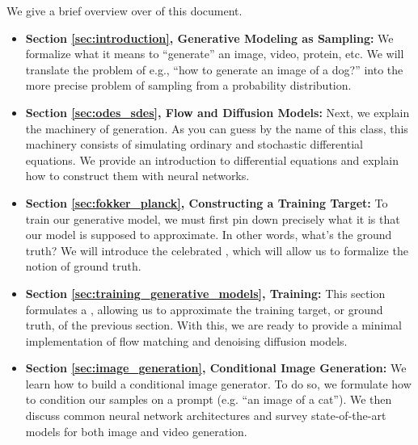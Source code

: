 We give a brief overview over of this document.
\begin{itemize}
\item \textbf{\sffamily Section \ref{sec:introduction}, Generative Modeling as Sampling:} We formalize what it means to ``generate'' an image, video, protein, etc. We will translate the problem of e.g., ``how to generate an image of a dog?'' into the more precise problem of sampling from a probability distribution.
\item \textbf{\sffamily Section \ref{sec:odes_sdes}, Flow and Diffusion Models:} Next, we explain the machinery of generation. As you can guess by the name of this class, this machinery consists of simulating ordinary and stochastic differential equations. We provide an introduction to differential equations and explain how to construct them with neural networks. 
\item \textbf{\sffamily Section \ref{sec:fokker_planck}, Constructing a Training Target:} To train our generative model, we must first pin down precisely what it is that our model is supposed to approximate. In other words, what's the ground truth? We will introduce the celebrated , which will allow us to formalize the notion of ground truth.
\item \textbf{\sffamily Section \ref{sec:training_generative_models}, Training:} This section formulates a , allowing us to approximate the training target, or ground truth, of the previous section. With this, we are ready to provide a minimal implementation of flow matching and denoising diffusion models.
\item \textbf{\sffamily Section \ref{sec:image_generation}, Conditional Image Generation:} We learn how to build a conditional image generator. To do so, we formulate how to condition our samples on a prompt (e.g. ``an image of a cat''). We then discuss common neural network architectures and survey state-of-the-art models for both image and video generation.
\end{itemize}

